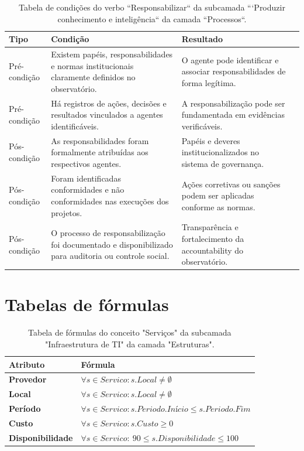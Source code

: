 \begin{apendicesenv}
\begin{table}[H]
\centering
\caption{Tabela de condições do verbo ``Responsabilizar`` da subcamada ```Produzir conhecimento e inteligência`` da camada ``Processos``.}
\begin{tabularx}{\textwidth}{|l|X|X|X|}
\hline
\textbf{Tipo} & \textbf{Condição} & \textbf{Resultado} \\ \hline
Pré-condição & Existem papéis, responsabilidades e normas institucionais claramente definidos no observatório. & O agente pode identificar e associar responsabilidades de forma legítima.\\ \hline
Pré-condição & Há registros de ações, decisões e resultados vinculados a agentes identificáveis. & A responsabilização pode ser fundamentada em evidências verificáveis.\\ \hline
Pós-condição & As responsabilidades foram formalmente atribuídas aos respectivos agentes. & Papéis e deveres institucionalizados no sistema de governança.\\ \hline
Pós-condição & Foram identificadas conformidades e não conformidades nas execuções dos projetos. & Ações corretivas ou sanções podem ser aplicadas conforme as normas.\\ \hline
Pós-condição & O processo de responsabilização foi documentado e disponibilizado para auditoria ou controle social. & Transparência e fortalecimento da accountability do observatório.\\ \hline
\end{tabularx}
\end{table}

\section{Tabelas de fórmulas}

\begin{table}[H]
\centering
\caption{Tabela de fórmulas do conceito "Serviços" da subcamada "Infraestrutura de TI" da camada "Estruturas".}
\begin{tabularx}{\textwidth}{|l|X|}
\hline
\textbf{Atributo} & \textbf{Fórmula} \\ \hline
\textbf{Provedor} & $\forall s \in Servico: s.Local \neq \emptyset$ \\ \hline
\textbf{Local} & $\forall s \in Servico: s.Local \neq \emptyset$ \\ \hline
\textbf{Período} & $\forall s \in Servico: s.Periodo.Início \leq s.Periodo.Fim$ \\ \hline
\textbf{Custo} & $\forall s \in Servico: s.Custo \geq 0$ \\ \hline
\textbf{Disponibilidade} & $\forall s \in Servico: \ 90 \leq s.Disponibilidade \leq 100$ \\ \hline
\end{tabularx}
\end{table}


\end{apendicesenv}
